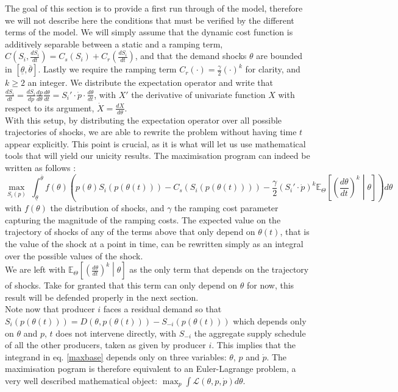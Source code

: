 The goal of this section is to provide a first run through of the model, therefore we will not describe here the conditions that must be verified by the different terms of the model. We will simply assume that the dynamic cost function is additively separable between a static and a ramping term, $C(S_i,\frac{dS_i}{dt})=C_s(S_i)+C_r(\frac{dS_i}{dt})$, and that the demand shocks $\theta$ are bounded in $[\underline{\theta},\overline{\theta}]$. Lastly we require the ramping term $C_r(\cdot)=\frac{\gamma}{2}(\cdot)^k$ for clarity, and $k\geq2$ an integer. We distribute the expectation operator and write that $\frac{dS_i}{dt}=\frac{dS_i}{dp}\frac{dp}{d\theta}\frac{d\theta}{dt}=S_i'\cdot \dot{p}\cdot \frac{d\theta}{dt}$, with $X'$ the derivative of univariate function $X$ with respect to its argument, $\dot{X}=\frac{dX}{d\theta}$. \\

With this setup, by distributing the expectation operator over all possible trajectories of shocks, we are able to rewrite the problem without having time $t$ appear explicitly. This point is crucial, as it is what will let us use mathematical tools that will yield our unicity results. The maximisation program can indeed be written as follows :
\begin{equation}
\displaystyle{\max_{S_i(p)}}~\int_{\underline{\theta}}^{\overline{\theta}} f(\theta)\left(p(\theta)S_i(p(\theta(t))) -C_s(S_i(p(\theta(t))))-\frac{\gamma}{2}\left(S_i'\cdot\dot{p}\right)^k\mathbb{E}_{\Theta}\left[\left(\frac{d\theta}{dt}\right)^k\middle \vert \theta  \right]\right)d\theta
\label{maxbase}
\end{equation}
with $f(\theta)$ the distribution of shocks, and $\gamma$ the ramping cost parameter capturing the magnitude of the ramping costs. The expected value on the trajectory of shocks of any of the terms above that only depend on $\theta(t)$, that is the value of the shock at a point in time, can be rewritten simply as an integral over the possible values of the shock. \\

We are left with $\mathbb{E}_{\Theta}\left[\left(\frac{d\theta}{dt}\right)^k\middle \vert \theta  \right]$ as the only term that depends on the trajectory of shocks. Take for granted that this term can only depend on $\theta$ for now, this result will be defended properly in the next section. \\

Note now that producer $i$ faces a residual demand so that $S_i(p(\theta(t)))=D(\theta,p(\theta(t)))-S_{-i}(p(\theta(t)))$ which depends only on $\theta$ and $p$, $t$ does not intervene directly, with $S_{-i}$ the aggregate supply schedule of all the other producers, taken as given by producer $i$. This implies that the integrand in eq. \ref{maxbase} depends only on three variables: $\theta$, $p$ and $\dot{p}$.  The maximisation pogram is therefore equivalent to an Euler-Lagrange problem, a very well described mathematical object: $\max_p\int\mathcal{L}(\theta,p,\dot{p})d\theta$. \\

